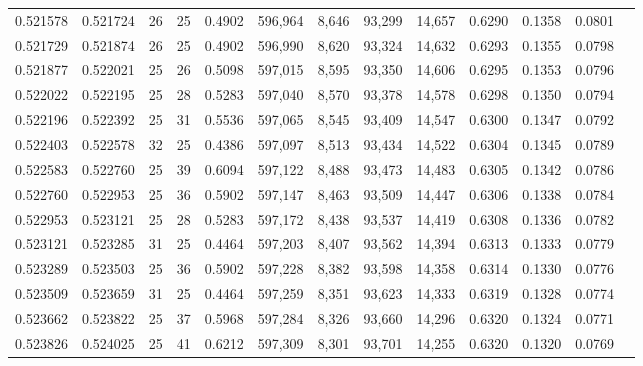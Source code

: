 \begin{tabular}{rrrrrrrrrrrrr}
0.521578 & 0.521724 &    26 &  25 &                                     0.4902 & 596,964 &   8,646 &  93,299 &  14,657 & 0.6290 & 0.1358 & 0.0801 \\
0.521729 & 0.521874 &    26 &  25 &                                     0.4902 & 596,990 &   8,620 &  93,324 &  14,632 & 0.6293 & 0.1355 & 0.0798 \\
0.521877 & 0.522021 &    25 &  26 &                                     0.5098 & 597,015 &   8,595 &  93,350 &  14,606 & 0.6295 & 0.1353 & 0.0796 \\
0.522022 & 0.522195 &    25 &  28 &                                     0.5283 & 597,040 &   8,570 &  93,378 &  14,578 & 0.6298 & 0.1350 & 0.0794 \\
0.522196 & 0.522392 &    25 &  31 &                                     0.5536 & 597,065 &   8,545 &  93,409 &  14,547 & 0.6300 & 0.1347 & 0.0792 \\
0.522403 & 0.522578 &    32 &  25 &                                     0.4386 & 597,097 &   8,513 &  93,434 &  14,522 & 0.6304 & 0.1345 & 0.0789 \\
0.522583 & 0.522760 &    25 &  39 &                                     0.6094 & 597,122 &   8,488 &  93,473 &  14,483 & 0.6305 & 0.1342 & 0.0786 \\
0.522760 & 0.522953 &    25 &  36 &                                     0.5902 & 597,147 &   8,463 &  93,509 &  14,447 & 0.6306 & 0.1338 & 0.0784 \\
0.522953 & 0.523121 &    25 &  28 &                                     0.5283 & 597,172 &   8,438 &  93,537 &  14,419 & 0.6308 & 0.1336 & 0.0782 \\
0.523121 & 0.523285 &    31 &  25 &                                     0.4464 & 597,203 &   8,407 &  93,562 &  14,394 & 0.6313 & 0.1333 & 0.0779 \\
0.523289 & 0.523503 &    25 &  36 &                                     0.5902 & 597,228 &   8,382 &  93,598 &  14,358 & 0.6314 & 0.1330 & 0.0776 \\
0.523509 & 0.523659 &    31 &  25 &                                     0.4464 & 597,259 &   8,351 &  93,623 &  14,333 & 0.6319 & 0.1328 & 0.0774 \\
0.523662 & 0.523822 &    25 &  37 &                                     0.5968 & 597,284 &   8,326 &  93,660 &  14,296 & 0.6320 & 0.1324 & 0.0771 \\
0.523826 & 0.524025 &    25 &  41 &                                     0.6212 & 597,309 &   8,301 &  93,701 &  14,255 & 0.6320 & 0.1320 & 0.0769 \\

\end{tabular}
